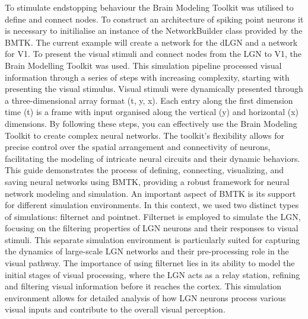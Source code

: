 \documentclass[12pt]{article}
\begin{document}
To stimulate endstopping behaviour the Brain Modeling Toolkit was utilised to define and connect nodes. To construct an architecture of spiking point neurons it is necessary to initilialise an instance of the NetworkBuilder class provided by the BMTK. The current example will create a network for the dLGN and a network for V1. To present the visual stimuli and connect nodes from the LGN to V1, the Brain Modelling Toolkit was used. This simulation pipeline processed visual information through a series of steps with increasing complexity, starting with presenting the visual stimulus. Visual stimuli were dynamically presented through a three-dimensional array format (t, y, x). Each entry along the first dimension time (t) is a frame with input organised along the vertical (y) and horizontal (x) dimensions. By following these steps, you can effectively use the Brain Modeling Toolkit to create complex neural networks. The toolkit's flexibility allows for precise control over the spatial arrangement and connectivity of neurons, facilitating the modeling of intricate neural circuits and their dynamic behaviors. This guide demonstrates the process of defining, connecting, visualizing, and saving neural networks using BMTK, providing a robust framework for neural network modeling and simulation. An important aspect of BMTK is its support for different simulation environments. In this context, we used two distinct types of simulations: filternet and pointnet. Filternet is employed to simulate the LGN, focusing on the filtering properties of LGN neurons and their responses to visual stimuli. This separate simulation environment is particularly suited for capturing the dynamics of large-scale LGN networks and their pre-processing role in the visual pathway. The importance of using filternet lies in its ability to model the initial stages of visual processing, where the LGN acts as a relay station, refining and filtering visual information before it reaches the cortex. This simulation environment allows for detailed analysis of how LGN neurons process various visual inputs and contribute to the overall visual perception.
\bigbreak
\end{document}
